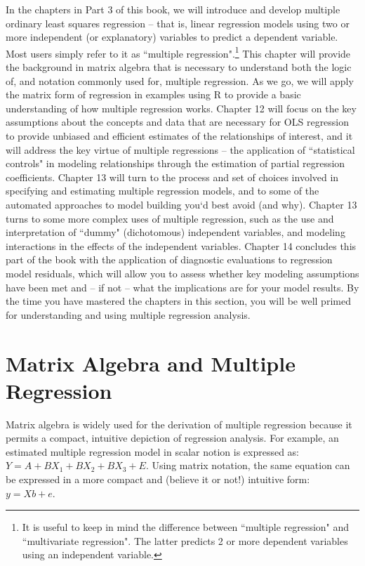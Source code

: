 \documentclass[11pt,openany]{book}\usepackage[]{graphicx}\usepackage[]{color}
\begin{document}
In the chapters in Part 3 of this book, we will introduce and develop multiple ordinary least squares regression -- that is, linear regression models using two or more independent (or explanatory) variables to predict a dependent variable. Most users simply refer to it as ``multiple regression".\footnote{It is useful to keep in mind the difference between ``multiple regression" and ``multivariate regression". The latter predicts 2 or more dependent variables using an independent variable.} This chapter will provide the background in matrix algebra that is necessary to understand both the logic of, and notation commonly used for, multiple regression. As we go, we will apply the matrix form of regression in examples using R to provide a basic understanding of how multiple regression works.  Chapter 12 will focus on the key assumptions about the concepts and data that are necessary for OLS regression to provide unbiased and efficient estimates of the relationships of interest, and it will address the key virtue of multiple regressions -- the application of ``statistical controls" in modeling relationships through the estimation of partial regression coefficients. Chapter 13 will turn to the process and set of choices involved in specifying and estimating multiple regression models, and to some of the automated approaches to model building you`d best avoid (and why). Chapter 13 turns to some more complex uses of multiple regression, such as the use and interpretation of ``dummy" (dichotomous) independent variables, and modeling interactions in the effects of the independent variables.  Chapter 14 concludes this part of the book with the application of diagnostic evaluations to regression model residuals, which will allow you to assess whether key modeling assumptions have been met and -- if not -- what the implications are for your model results. By the time you have mastered the chapters in this section, you will be well primed for understanding and using multiple regression analysis.

\section{Matrix Algebra and Multiple Regression}

Matrix algebra is widely used for the derivation of multiple regression because it permits a compact, intuitive depiction of regression analysis. For
example, an estimated multiple regression model in scalar notion is expressed as: $Y = A + BX_1 + BX_2 + BX_3 + E$. Using matrix notation, 
the same equation can be expressed in a more compact and (believe it or not!) intuitive form: $y = Xb + e$.
 
\end{document}
